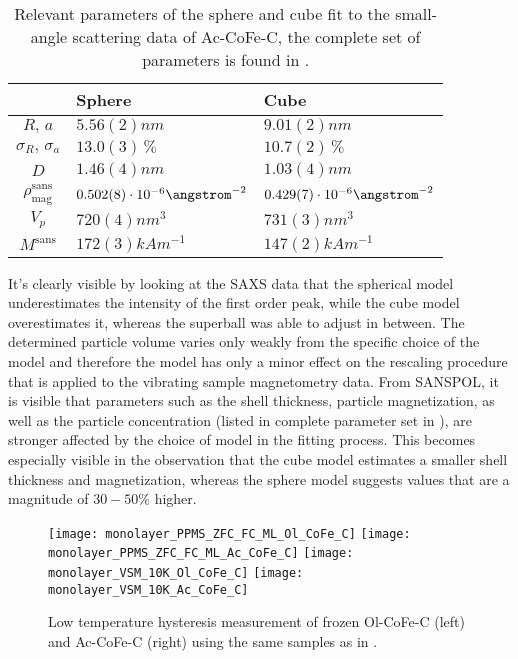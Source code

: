 \documentclass[\main/dresen_thesis.tex]{subfiles}
\begin{document}
    \begin{table}[ht]
      \centering
      \caption{\label{tab:monolayers:nanoparticle:sasSphereCubeFit}Relevant parameters of the sphere and cube fit to the small-angle scattering data of Ac-CoFe-C, the complete set of parameters is found in .}
      \begin{tabular}{ c | l | l }
          & Sphere & Cube \\
        \hline
        $R, \, a$
          & $5.56(2) \unit{nm}$
          & $9.01(2) \unit{nm}$\\
        $\sigma_R, \, \sigma_a$
          & $13.0(3) \,\%$
          & $10.7(2) \,\%$\\
        $D$
          & $1.46(4) \unit{nm}$
          & $1.03(4) \unit{nm}$\\
        $\rho_\mathrm{mag}^\mathrm{sans}$
          & $0.502(8) \cdot 10^{-6} \angstrom^{-2}$
          & $0.429(7) \cdot 10^{-6} \angstrom^{-2}$\\
        \hline
        $V_p$
          & $720(4) \unit{nm^{3}}$
          & $731(3) \unit{nm^{3}}$\\
        $M^\mathrm{sans}$
          & $172(3) \unit{kAm^{-1}}$
          & $147(2) \unit{kAm^{-1}}$\\
        \hline
      \end{tabular}
    \end{table}

    It's clearly visible by looking at the SAXS data that the spherical model underestimates the intensity of the first order peak, while the cube model overestimates it, whereas the superball was able to adjust in between.
    The determined particle volume varies only weakly from the specific choice of the model and therefore the model has only a minor effect on the rescaling procedure that is applied to the vibrating sample magnetometry data.
    From SANSPOL, it is visible that parameters such as the shell thickness, particle magnetization, as well as the particle concentration (listed in complete parameter set in ), are stronger affected by the choice of model in the fitting process.
    This becomes especially visible in the observation that the cube model estimates a smaller shell thickness and magnetization, whereas the sphere model suggests values that are a magnitude of $30 - 50 \unit{\%}$ higher.

    \begin{figure}[tb]
      \centering
      \texttt{[image: monolayer\_PPMS\_ZFC\_FC\_ML\_Ol\_CoFe\_C]}
      \texttt{[image: monolayer\_PPMS\_ZFC\_FC\_ML\_Ac\_CoFe\_C]}
      \texttt{[image: monolayer\_VSM\_10K\_Ol\_CoFe\_C]}
      \texttt{[image: monolayer\_VSM\_10K\_Ac\_CoFe\_C]}
      \caption{\label{fig:monolaye rs:nanoparticle:vsm10K}Low temperature hysteresis measurement of frozen Ol-CoFe-C (left) and Ac-CoFe-C (right) using the same samples as in .}
    \end{figure}
\end{document}
